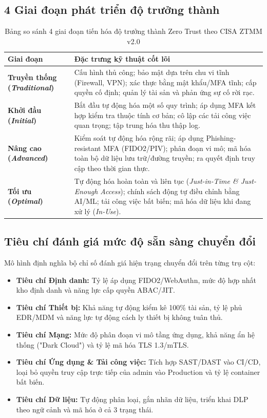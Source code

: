 \subsection{4 Giai đoạn phát triển độ trưởng thành}
\label{subsec:2_2_3}

\begin{table}[htbp]
\centering
\caption{Bảng so sánh 4 giai đoạn tiến hóa độ trưởng thành Zero Trust theo CISA ZTMM v2.0}
\label{tab:cisa_maturity_stages}
\small
\begin{tabular}{|p{3cm}|p{10.5cm}|}
\hline
\textbf{Giai đoạn} & \textbf{Đặc trưng kỹ thuật cốt lõi} \\ \hline
\textbf{Truyền thống (\textit{Traditional})} & Cấu hình thủ công; bảo mật dựa trên chu vi tĩnh (Firewall, VPN); xác thực bằng mật khẩu/MFA tĩnh; cấp quyền cố định; quản lý tài sản và phản ứng sự cố rời rạc. \\ \hline
\textbf{Khởi đầu (\textit{Initial})} & Bắt đầu tự động hóa một số quy trình; áp dụng MFA kết hợp kiểm tra thuộc tính cơ bản; cô lập các tải công việc quan trọng; tập trung hóa thu thập log. \\ \hline
\textbf{Nâng cao (\textit{Advanced})} & Kiểm soát tự động hóa rộng rãi; áp dụng Phishing-resistant MFA (FIDO2/PIV); phân đoạn vi mô; mã hóa toàn bộ dữ liệu lưu trữ/đường truyền; ra quyết định truy cập theo thời gian thực. \\ \hline
\textbf{Tối ưu (\textit{Optimal})} & Tự động hóa hoàn toàn và liên tục (\textit{Just-in-Time \& Just-Enough Access}); chính sách động tự điều chỉnh bằng AI/ML; tải công việc bất biến; mã hóa dữ liệu khi đang xử lý (\textit{In-Use}). \\ \hline
\end{tabular}
\end{table}

\subsection{Tiêu chí đánh giá mức độ sẵn sàng chuyển đổi}
\label{subsec:2_2_4}

Mô hình định nghĩa bộ chỉ số đánh giá hiện trạng chuyển đổi trên từng trụ cột:
\begin{itemize}
    \item \textbf{Tiêu chí Định danh:} Tỷ lệ áp dụng FIDO2/WebAuthn, mức độ hợp nhất kho định danh và năng lực cấp quyền ABAC/JIT.
    \item \textbf{Tiêu chí Thiết bị:} Khả năng tự động kiểm kê 100\% tài sản, tỷ lệ phủ EDR/MDM và năng lực tự động cách ly thiết bị không tuân thủ.
    \item \textbf{Tiêu chí Mạng:} Mức độ phân đoạn vi mô tầng ứng dụng, khả năng ẩn hệ thống ("Dark Cloud") và tỷ lệ mã hóa TLS 1.3/mTLS.
    \item \textbf{Tiêu chí Ứng dụng \& Tải công việc:} Tích hợp SAST/DAST vào CI/CD, loại bỏ quyền truy cập trực tiếp của admin vào Production và tỷ lệ container bất biến.
    \item \textbf{Tiêu chí Dữ liệu:} Tự động phân loại, gắn nhãn dữ liệu, triển khai DLP theo ngữ cảnh và mã hóa ở cả 3 trạng thái.
\end{itemize}

